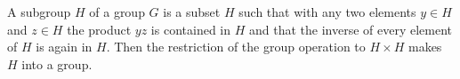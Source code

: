 A subgroup $H$ of a group $G$ is a subset $H$ such that with any two elements $y \in H$ and $z \in H$ the product $yz$ is contained in $H$ and that the inverse of every element of $H$ is again in $H$. Then the restriction of the group operation to $H \times H$ makes $H$ into a group.

